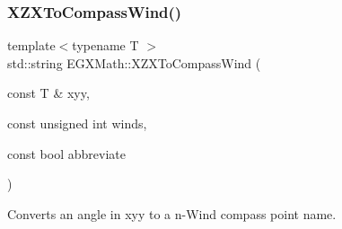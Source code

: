 \subsubsection{\texorpdfstring{X\+Z\+X\+To\+Compass\+Wind()}{XZXToCompassWind()}}
{\footnotesize\ttfamily template$<$typename T $>$ \\
std\+::string E\+G\+X\+Math\+::\+X\+Z\+X\+To\+Compass\+Wind (\begin{DoxyParamCaption}\item[{const T \&}]{xyy,  }\item[{const unsigned int}]{winds,  }\item[{const bool}]{abbreviate }\end{DoxyParamCaption})}



Converts an angle in xyy to a n-\/\+Wind compass point name. 

